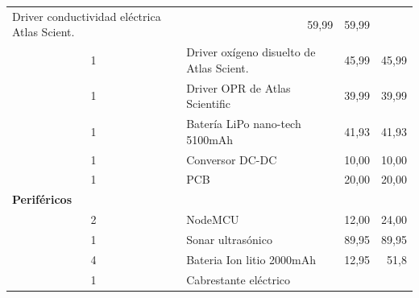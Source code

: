 \begin{table}[t]
\begin{tabular}{c l c c}
\multicolumn{1}{l}{Driver conductividad eléctrica Atlas Scient.} & 
\multicolumn{1}{r}{59,99}                          & 
\multicolumn{1}{r}{59,99}              \\ 
\multicolumn{1}{c}{1}                             & 
\multicolumn{1}{l}{Driver oxígeno disuelto de Atlas Scient.}        & 
\multicolumn{1}{r}{45,99}                          & 
\multicolumn{1}{r}{45,99}              \\ 
\multicolumn{1}{c}{1}                             & 
\multicolumn{1}{l}{Driver OPR de Atlas Scientific} & 
\multicolumn{1}{r}{39,99}                          & 
\multicolumn{1}{r}{39,99}              \\ 
\multicolumn{1}{c}{1}                             & 
\multicolumn{1}{l}{Batería LiPo nano-tech 5100mAh} & 
\multicolumn{1}{r}{41,93}                          & 
\multicolumn{1}{r}{41,93}              \\ 
\multicolumn{1}{c}{1}                             & 
\multicolumn{1}{l}{Conversor DC-DC}                & 
\multicolumn{1}{r}{10,00}                             & 
\multicolumn{1}{r}{10,00}                 \\ 
\multicolumn{1}{c}{1}                             & 
\multicolumn{1}{l}{PCB}                            & 
\multicolumn{1}{r}{20,00}                             &
\multicolumn{1}{r}{20,00}                 \\ 
\multicolumn{2}{l}{\textbf{Periféricos}}          &
\multicolumn{2}{l}{}                                                             \\ 
\hline
\multicolumn{1}{c}{2}                             & 
\multicolumn{1}{l}{NodeMCU}                        & 
\multicolumn{1}{r}{12,00}                             & 
\multicolumn{1}{r}{24,00}                 \\ 
\multicolumn{1}{c}{1}                             & 
\multicolumn{1}{l}{Sonar ultrasónico}              & 
\multicolumn{1}{r}{89,95}                          & 
\multicolumn{1}{r}{89,95}              \\ 
\multicolumn{1}{c}{4}                             & 
\multicolumn{1}{l}{Bateria Ion litio 2000mAh}      & 
\multicolumn{1}{r}{12,95}                          & 
\multicolumn{1}{r}{51,8}               \\ 
\multicolumn{1}{c}{1}                             & 
\multicolumn{1}{l}{Cabrestante eléctrico}          & 

\end{tabular}
\end{table}
